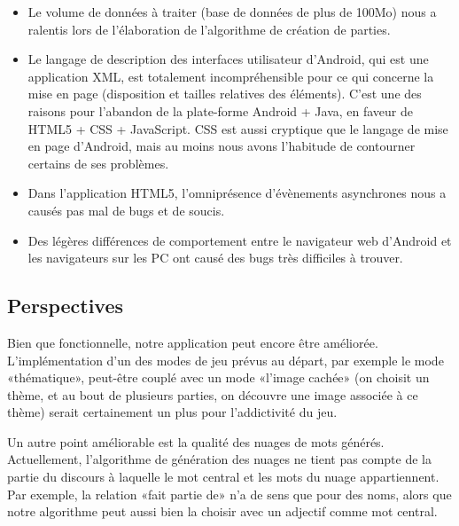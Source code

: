 \documentclass[a4paper,11pt,french]{article}
\def\android{Android\texttrademark{}}
\begin{document}
{\begin{itemize}
  en une requête qui récupère tout le set de résultats, ajoute une colonne random(), prend les 100 premiers résultats et les trie. Mais cela
  l'oblige à récupérer tout le set de résultats, et calculer le random() pour chaque ligne, pour ensuite jeter tout ce qui dépasse la ligne
  100. Cela est évidemment très coûteux dans le cadre de requêtes avec beaucoup de résultats, et nous avons donc dû isoler la requête avec
  \verb!limit! de son \verb!order by! avec des «hacks» assez tordus pour tromper l'optimiseur.
\item Le volume de données à traiter (base de données de plus de 100Mo) nous a ralentis lors de l'élaboration de l'algorithme de création de
  parties.
\item Le langage de description des interfaces utilisateur d'\android{}, qui est une application XML, est totalement incompréhensible pour
  ce qui concerne la mise en page (disposition et tailles relatives des éléments). C'est une des raisons pour l'abandon de la plate-forme
  \android{} + Java, en faveur de HTML5 + CSS + JavaScript. CSS est aussi cryptique que le langage de mise en page d'\android{}, mais au
  moins nous avons l'habitude de contourner certains de ses problèmes.
\item Dans l'application HTML5, l'omniprésence d'évènements asynchrones nous a causés pas mal de bugs et de soucis.
\item Des légères différences de comportement entre le navigateur web d'\android{} et les navigateurs sur les PC ont causé des bugs très
  difficiles à trouver.
\end{itemize}

\subsection{Perspectives}

Bien que fonctionnelle, notre application peut encore être améliorée. L'implémentation d'un des modes de jeu prévus au départ, par exemple
le mode «thématique», peut-être couplé avec un mode «l'image cachée» (on choisit un thème, et au bout de plusieurs parties, on découvre une
image associée à ce thème) serait certainement un plus pour l'addictivité du jeu.

Un autre point améliorable est la qualité des nuages de mots générés. Actuellement, l'algorithme de génération des nuages ne tient pas
compte de la partie du discours à laquelle le mot central et les mots du nuage appartiennent. Par exemple, la relation «fait partie de» n'a
de sens que pour des noms, alors que notre algorithme peut aussi bien la choisir avec un adjectif comme mot central.

}
\end{document}
